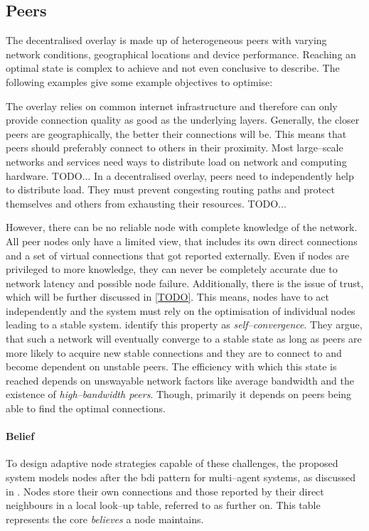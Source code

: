 \subsection{Peers}
The decentralised overlay is made up of heterogeneous peers with varying network conditions, geographical locations and device performance. Reaching an optimal state is complex to achieve and not even conclusive to describe. The following examples give some example objectives to optimise:
\begin{itemize}
    The overlay relies on common internet infrastructure and therefore can only provide connection quality as good as the underlying layers. Generally, the closer peers are geographically, the better their connections will be. This means that peers should preferably connect to others in their proximity.
    Most large–scale networks and services need ways to distribute load on network and computing hardware. TODO... In a decentralised overlay, peers need to independently help to distribute load. They must prevent congesting routing paths and protect themselves and others from exhausting their resources.
    TODO...
\end{itemize}

However, there can be no reliable node with complete knowledge of the network. All peer nodes only have a limited view, that includes its own direct connections and a set of virtual connections that got reported externally. Even if nodes are privileged to more knowledge, they can never be completely accurate due to network latency and possible node failure. Additionally, there is the issue of trust, which will be further discussed in \ref{TODO}. This means, nodes have to act independently and the system must rely on the optimisation of individual nodes leading to a stable system. \citet*[V.B]{coolstreaming-design-theory} identify this property as \textit{self–convergence}. They argue, that such a network will eventually converge to a stable state as long as peers are more likely to acquire new stable connections and they are to connect to and become dependent on unstable peers. The efficiency with which this state is reached depends on unswayable network factors like average bandwidth and the existence of \textit{high–bandwidth peers}. Though, primarily it depends on peers being able to find the optimal connections.

\paragraph{Belief}\label{par:bdi-belief}
To design adaptive node strategies capable of these challenges, the proposed system models nodes after the \gls{bdi} pattern for multi–agent systems, as discussed in \cite{TODO}.
Nodes store their own connections and those reported by their direct neighbours in a local look–up table, referred to as \peerTable further on. This table represents the core \textit{believes} a node maintains.

